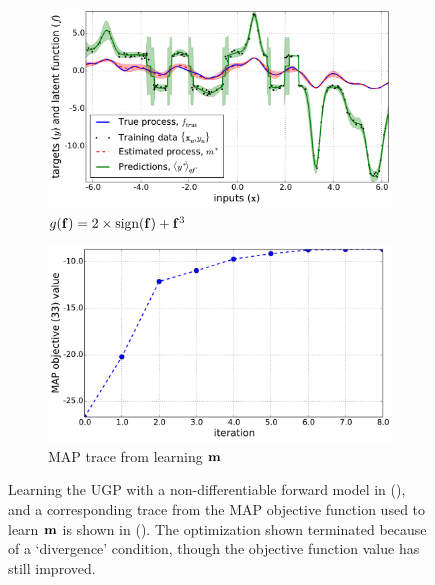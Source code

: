 \documentclass{article} %
\begin{document}
%
\begin{figure}[tb]
    \begin{subfigure}[b]{0.5\linewidth}
        \includegraphics[width=\linewidth]{fig/signdemo}
        \caption{$g\!\left({{\mathbf{f}}}\right) = 2\times\text{sign}\!\left({\mathbf{f}}\right)
            + \mathbf{f}^3$}
        \label{sub:sign}
    \end{subfigure}
    \begin{subfigure}[b]{0.5\linewidth}
        \includegraphics[width=\linewidth]{fig/trace}
        \caption{MAP trace from learning $\mathbf{m}$}
        \label{sub:mape}
        \vspace{0.5mm}
    \end{subfigure}

    \caption[]{Learning the UGP with a non-differentiable forward model in
        (), and a corresponding trace from the MAP objective
        function used to learn $\mathbf{m}$ is shown in (). The
        optimization shown terminated because of a `divergence' condition,
        though the objective function value has still improved.}

    \label{fig:learnex}
\end{figure}
\end{document}
